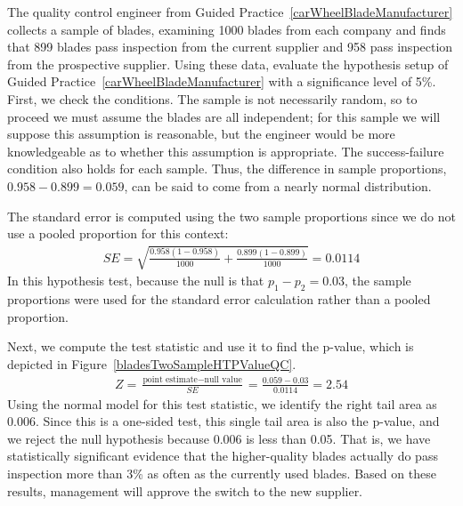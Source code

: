 \begin{examplewrap}
\begin{nexample}{The quality control engineer from Guided Practice~\ref{carWheelBladeManufacturer} collects a sample of blades, examining 1000 blades from each company and finds that 899 blades pass inspection from the current supplier and 958 pass inspection from the prospective supplier. Using these data, evaluate the hypothesis setup of Guided Practice~\ref{carWheelBladeManufacturer} with a significance level of 5\%.}\label{qualityCtrlEngHypothesisEval}
First, we check the conditions. The sample is not necessarily random, so to proceed we must assume the blades are all independent; for this sample we will suppose this assumption is reasonable, but the engineer would be more knowledgeable as to whether this assumption is appropriate. The success-failure condition also holds for each sample. Thus, the difference in sample proportions, $0.958 - 0.899 = 0.059$, can be said to come from a nearly normal distribution.

The standard error is computed using the two sample proportions since we do not use a pooled proportion for this context:
\begin{align*}
SE = \sqrt{\frac{0.958(1-0.958)}{1000} + \frac{0.899(1-0.899)}{1000}} = 0.0114
\end{align*}
In this hypothesis test, because the null is that $p_1 - p_2 = 0.03$, the sample proportions were used for the standard error calculation rather than a pooled proportion.

Next, we compute the test statistic and use it to find the p-value, which is depicted in Figure~\ref{bladesTwoSampleHTPValueQC}.
\begin{align*}
Z = \frac{\text{point estimate} - \text{null value}}{SE}
    = \frac{0.059 - 0.03}{0.0114} = 2.54
\end{align*}
Using the normal model for this test statistic, we identify the right tail area as 0.006. Since this is a one-sided test, this single tail area is also the p-value, and we reject the null hypothesis because 0.006 is less than 0.05. That is, we have statistically significant evidence that the higher-quality blades actually do pass inspection more than 3\% as often as the currently used blades. Based on these results, management will approve the switch to the new supplier.
\end{nexample}
\end{examplewrap}

